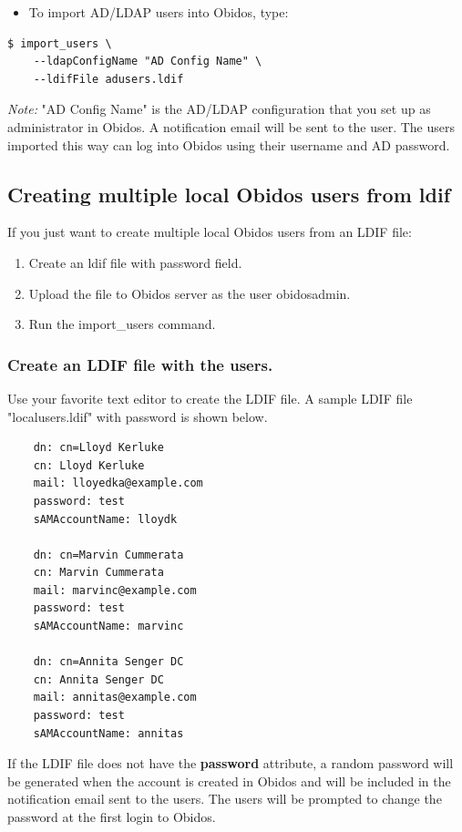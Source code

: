 \begin{itemize}
	\item To import AD/LDAP users into Obidos, type:
\end{itemize}

\begin{verbatim}
$ import_users \
    --ldapConfigName "AD Config Name" \
    --ldifFile adusers.ldif
\end{verbatim}
\textit{Note:} "AD Config Name" is the AD/LDAP configuration that you set up
as administrator in Obidos.
A notification email will be sent to the user. The users imported this way can log into
Obidos using their username and AD password.
\subsection{Creating multiple local Obidos users from ldif}
    If you just want to create multiple local Obidos users from an LDIF file:
\begin{enumerate}
    \item Create an ldif file with password field.
    \item Upload the file to Obidos server as the user obidosadmin.
    \item Run the import\_users command.
\end{enumerate}

\subsubsection{Create an LDIF file with the users.}
Use your favorite text editor to create the LDIF file. A sample LDIF file "localusers.ldif" with password is shown below. 

\begin{verbatim}
    dn: cn=Lloyd Kerluke
    cn: Lloyd Kerluke
    mail: lloyedka@example.com
    password: test
    sAMAccountName: lloydk
    
    dn: cn=Marvin Cummerata
    cn: Marvin Cummerata
    mail: marvinc@example.com
    password: test
    sAMAccountName: marvinc
    
    dn: cn=Annita Senger DC
    cn: Annita Senger DC
    mail: annitas@example.com
    password: test
    sAMAccountName: annitas    
\end{verbatim}

If the LDIF file does not have the \textbf{password} attribute, a random password
will be generated when the account is created in Obidos and will be included in the
notification email sent to the users. 
The users will be prompted to change the password at the first login to Obidos.

